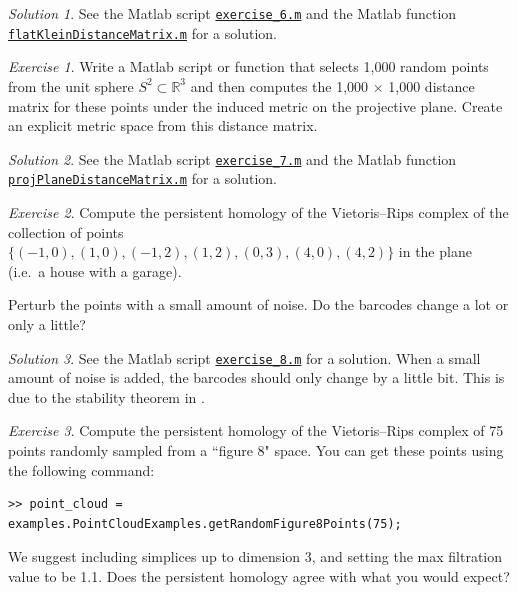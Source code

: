 \documentclass[amscd, amssymb, verbatim]{amsart}[12pt]
\theoremstyle{remark}
\theoremstyle{remark}
\newtheorem{exerciseSol}{Exercise}
\theoremstyle{remark}
\newtheorem*{solution}{Solution}
\newcommand{\R}{\mathbb{R}}
\begin{document}
\begin{solution}
See the Matlab script \href{https://github.com/appliedtopology/javaplex/tree/master/src/matlab/for_distribution/tutorial_solutions/exercise_6.m}{\texttt{exercise\_6.m}} and the Matlab function \href{https://github.com/appliedtopology/javaplex/tree/master/src/matlab/for_distribution/tutorial_solutions/flatKleinDistanceMatrix.m}{\texttt{flatKleinDistanceMatrix.m}} for a solution.
\end{solution}

\begin{exerciseSol}
Write a Matlab script or function that selects 1,000 random points from the unit sphere $S^2 \subset \R^3$ and then computes the 1,000 $\times$ 1,000 distance matrix for these points under the induced metric on the projective plane. Create an explicit metric space from this distance matrix. 
\end{exerciseSol}

\begin{solution}
See the Matlab script \href{https://github.com/appliedtopology/javaplex/tree/master/src/matlab/for_distribution/tutorial_solutions/exercise_7.m}{\texttt{exercise\_7.m}} and the Matlab function \href{https://github.com/appliedtopology/javaplex/tree/master/src/matlab/for_distribution/tutorial_solutions/projPlaneDistanceMatrix.m}{\texttt{projPlaneDistanceMatrix.m}} for a solution.
\end{solution}

\begin{exerciseSol}
Compute the persistent homology of the Vietoris--Rips complex of the collection of points $\{(-1,0),(1,0),(-1,2),(1,2),(0,3),(4,0),(4,2)\}$ in the plane (i.e.\ a house with a garage).

Perturb the points with a small amount of noise. Do the barcodes change a lot or only a little?
\end{exerciseSol}

\begin{solution}
See the Matlab script \href{https://github.com/appliedtopology/javaplex/tree/master/src/matlab/for_distribution/tutorial_solutions/exercise_8.m}{\texttt{exercise\_8.m}} for a solution. When a small amount of noise is added, the barcodes should only change by a little bit. This is due to the stability theorem in \cite{ChazalDeSilvaOudot2013}.
\end{solution}

\begin{exerciseSol}
Compute the persistent homology of the Vietoris--Rips complex of 75 points randomly sampled from a ``figure 8" space. You can get these points using the following command:

\begin{verbatim}
>> point_cloud = examples.PointCloudExamples.getRandomFigure8Points(75);
\end{verbatim}

We suggest including simplices up to dimension 3, and setting the max filtration value to be 1.1. Does the persistent homology agree with what you would expect?
\end{exerciseSol}
\end{document}
